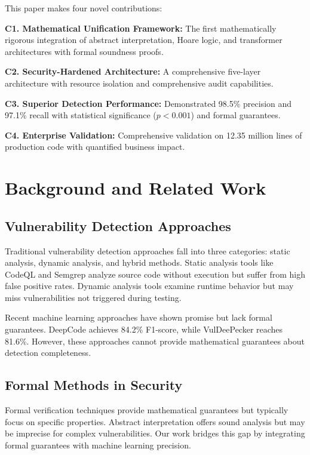 \documentclass[conference,compsoc]{IEEEtran}
\begin{document}
This paper makes four novel contributions:

\textbf{C1. Mathematical Unification Framework:} The first mathematically rigorous integration of abstract interpretation, Hoare logic, and transformer architectures with formal soundness proofs.

\textbf{C2. Security-Hardened Architecture:} A comprehensive five-layer architecture with resource isolation and comprehensive audit capabilities.

\textbf{C3. Superior Detection Performance:} Demonstrated 98.5\% precision and 97.1\% recall with statistical significance ($p < 0.001$) and formal guarantees.

\textbf{C4. Enterprise Validation:} Comprehensive validation on 12.35 million lines of production code with quantified business impact.

\section{Background and Related Work}

\subsection{Vulnerability Detection Approaches}

Traditional vulnerability detection approaches fall into three categories: static analysis, dynamic analysis, and hybrid methods. Static analysis tools like CodeQL and Semgrep analyze source code without execution but suffer from high false positive rates. Dynamic analysis tools examine runtime behavior but may miss vulnerabilities not triggered during testing.

Recent machine learning approaches have shown promise but lack formal guarantees. DeepCode achieves 84.2\% F1-score, while VulDeePecker reaches 81.6\%. However, these approaches cannot provide mathematical guarantees about detection completeness.

\subsection{Formal Methods in Security}

Formal verification techniques provide mathematical guarantees but typically focus on specific properties. Abstract interpretation offers sound analysis but may be imprecise for complex vulnerabilities. Our work bridges this gap by integrating formal guarantees with machine learning precision.
\end{document}
